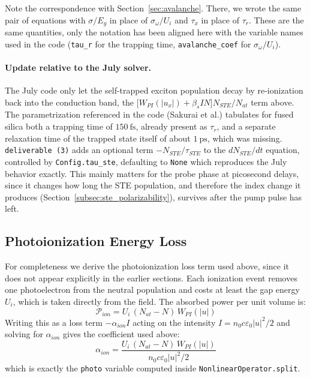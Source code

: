 Note the correspondence with Section~\ref{sec:avalanche}. There, we wrote the same pair of equations with $\sigma/E_g$ in place of $\sigma_\omega/U_i$ and $\tau_x$ in place of $\tau_r$. These are the same quantities, only the notation has been aligned here with the variable names used in the code (\texttt{tau\_r} for the trapping time, \texttt{avalanche\_coef} for $\sigma_\omega/U_i$).

\paragraph{Update relative to the July solver.} The July code only let the self-trapped exciton population decay by re-ionization back into the conduction band, the $\big[W_{PI}(|u_x|)+\beta_sIN\big]N_{STE}/N_{at}$ term above. The parametrization referenced in the code (Sakurai et al.) tabulates for fused silica both a trapping time of $150\ \text{fs}$, already present as $\tau_r$, and a separate relaxation time of the trapped state itself of about $1\ \text{ps}$, which was missing. \texttt{deliverable~(3)} adds an optional term $-N_{STE}/\tau_{STE}$ to the $dN_{STE}/dt$ equation, controlled by \texttt{Config.tau\_ste}, defaulting to \texttt{None} which reproduces the July behavior exactly. This mainly matters for the probe phase at picosecond delays, since it changes how long the STE population, and therefore the index change it produces (Section~\ref{subsec:ste_polarizability}), survives after the pump pulse has left.

\subsection{Photoionization Energy Loss}
\label{subsec:photoion_loss}

For completeness we derive the photoionization loss term used above, since it does not appear explicitly in the earlier sections. Each ionization event removes one photoelectron from the neutral population and costs at least the gap energy $U_i$, which is taken directly from the field. The absorbed power per unit volume is:
\begin{equation}
\mathcal{P}_{ion} = U_i\,(N_{at}-N)\,W_{PI}(|u|)
\end{equation}
Writing this as a loss term $-\alpha_{ion}I$ acting on the intensity $I=n_0c\varepsilon_0|u|^2/2$ and solving for $\alpha_{ion}$ gives the coefficient used above:
\begin{equation}
\alpha_{ion} = \frac{U_i\,(N_{at}-N)\,W_{PI}(|u|)}{n_0c\varepsilon_0|u|^2/2}
\end{equation}
which is exactly the \texttt{photo} variable computed inside \texttt{NonlinearOperator.split}.

